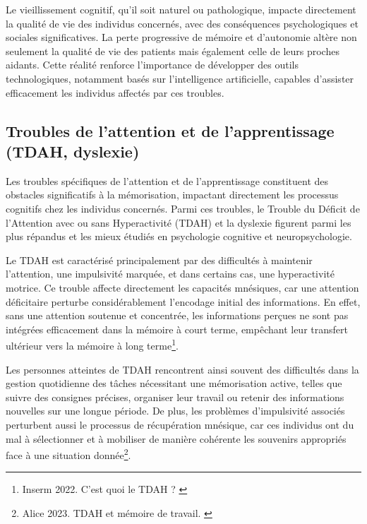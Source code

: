 \documentclass[11pt,a4paper]{report}
\begin{document}
Le vieillissement cognitif, qu’il soit naturel ou pathologique, impacte directement la qualité de vie des individus concernés, avec des conséquences psychologiques et sociales significatives. La perte progressive de mémoire et d’autonomie altère non seulement la qualité de vie des patients mais également celle de leurs proches aidants. Cette réalité renforce l’importance de développer des outils technologiques, notamment basés sur l’intelligence artificielle, capables d’assister efficacement les individus affectés par ces troubles.

\subsection{Troubles de l’attention et de l’apprentissage (TDAH, dyslexie)}

Les troubles spécifiques de l’attention et de l’apprentissage constituent des obstacles significatifs à la mémorisation, impactant directement les processus cognitifs chez les individus concernés. Parmi ces troubles, le Trouble du Déficit de l'Attention avec ou sans Hyperactivité (TDAH) et la dyslexie figurent parmi les plus répandus et les mieux étudiés en psychologie cognitive et neuropsychologie.

Le TDAH est caractérisé principalement par des difficultés à maintenir l’attention, une impulsivité marquée, et dans certains cas, une hyperactivité motrice. Ce trouble affecte directement les capacités mnésiques, car une attention déficitaire perturbe considérablement l'encodage initial des informations. En effet, sans une attention soutenue et concentrée, les informations perçues ne sont pas intégrées efficacement dans la mémoire à court terme, empêchant leur transfert ultérieur vers la mémoire à long terme\footnote{Inserm 2022. C’est quoi le TDAH ? \cite{inserm3}}.

Les personnes atteintes de TDAH rencontrent ainsi souvent des difficultés dans la gestion quotidienne des tâches nécessitant une mémorisation active, telles que suivre des consignes précises, organiser leur travail ou retenir des informations nouvelles sur une longue période. De plus, les problèmes d'impulsivité associés perturbent aussi le processus de récupération mnésique, car ces individus ont du mal à sélectionner et à mobiliser de manière cohérente les souvenirs appropriés face à une situation donnée\footnote{Alice 2023. TDAH et mémoire de travail. \cite{minicoachtdah}}.
\end{document}
